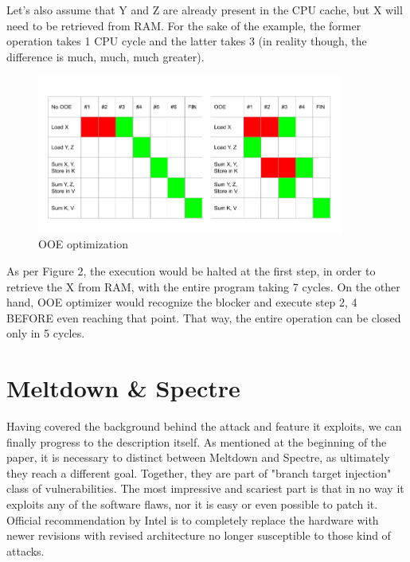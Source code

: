 \documentclass{article}
\begin{document}
Let's also assume that Y and Z are already present in the CPU cache, but X will need to be retrieved from RAM. For the sake of the example, the former operation takes 1 CPU cycle and the latter takes 3 (in reality though, the difference is much, much, much greater).

\begin{figure}[ht]
\centering
\includegraphics[width=0.9\textwidth]{OOE}
  \caption{OOE optimization}
\end{figure}

As per Figure 2, the execution would be halted at the first step, in order to retrieve the X from RAM, with the entire program taking 7 cycles. On the other hand, OOE optimizer would recognize the blocker and execute step 2, 4 BEFORE even reaching that point. That way, the entire operation can be closed only in 5 cycles.

 
\section{Meltdown \& Spectre}
 
Having covered the background behind the attack and feature it exploits, we can finally progress to the description itself. As mentioned at the beginning of the paper, it is necessary to distinct between Meltdown and Spectre, as ultimately they reach a different goal. Together, they are part of "branch target injection" class of vulnerabilities. The most impressive and scariest part is that in no way it exploits any of the software flaws, nor it is easy or even possible to patch it. Official recommendation by Intel is to completely replace the hardware with newer revisions with revised architecture no longer susceptible to those kind of attacks.
\end{document}
